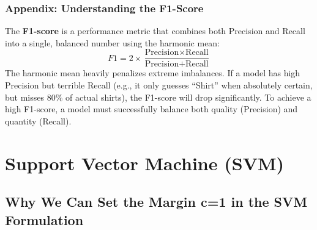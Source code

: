 \documentclass[twoside, 10pt]{article}
\begin{document}
\subsubsection{Appendix: Understanding the F1-Score}
The \textbf{F1-score} is a performance metric that combines both Precision and Recall into a single, balanced number using the harmonic mean:
\begin{equation}
F1 = 2 \times \frac{\text{Precision} \times \text{Recall}}{\text{Precision} + \text{Recall}}
\end{equation}
The harmonic mean heavily penalizes extreme imbalances. If a model has high Precision but terrible Recall (e.g., it only guesses ``Shirt'' when absolutely certain, but misses 80\% of actual shirts), the F1-score will drop significantly. To achieve a high F1-score, a model must successfully balance both quality (Precision) and quantity (Recall).

\section{Support Vector Machine (SVM)}
\subsection{\texorpdfstring{Why We Can Set the Margin c=1 in the SVM Formulation}{Why We Can Set the Margin c=1 in the SVM Formulation}}
\end{document}
